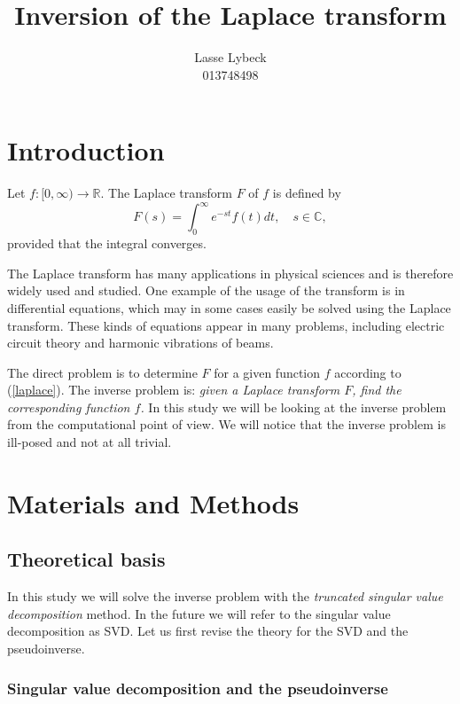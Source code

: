 \documentclass[12pt,a4]{article}
\title{Inversion of the Laplace transform}
\author{Lasse Lybeck\\013748498}
\newcommand{\R}{{\mathbb R}}
\newcommand{\C}{{\mathbb C}}
\begin{document}
\maketitle

\section{Introduction}

Let $f:[0,\infty)\rightarrow \R$. The Laplace transform $F$ of $f$ is defined by
\begin{equation}\label{laplace}
 F(s) = \int_0^\infty e^{-st}f(t)dt,\quad s\in\C ,
\end{equation}
provided that the integral converges.

The Laplace transform has many applications in physical sciences and is therefore widely used and studied. One example of the usage of the transform is in differential equations, which may in some cases easily be solved using the Laplace transform. These kinds of equations appear in many problems, including electric circuit theory and harmonic vibrations of beams. \cite{laplaceweb} \cite{transformsbook}

The direct problem is to determine $F$ for a given function $f$ according to (\ref{laplace}). The inverse problem is: {\em given a Laplace transform $F$, find the corresponding function $f$.} In this study we will be looking at the inverse problem from the computational point of view. We will notice that the inverse problem is ill-posed and not at all trivial.




\section{Materials and Methods}\label{sec:methods}

\subsection{Theoretical basis}

In this study we will solve the inverse problem with the \emph{truncated singular value decomposition} method. In the future we will refer to the singular value decomposition as SVD. Let us first revise the theory for the SVD and the pseudoinverse.

\subsubsection{Singular value decomposition and the pseudoinverse}
\label{sec:svd}
\end{document}
